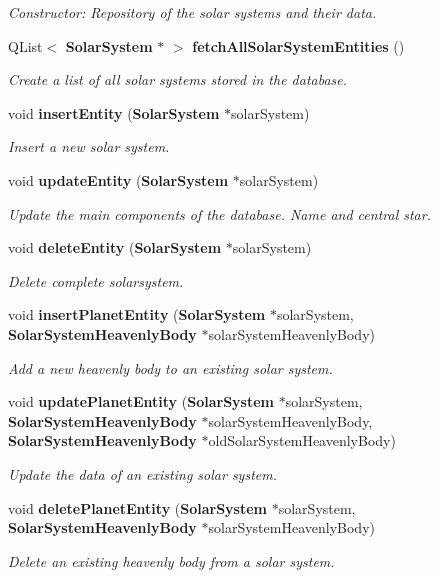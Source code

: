 \begin{DoxyCompactItemize}
\begin{DoxyCompactList}\small\item\em \-Constructor\-: \-Repository of the solar systems and their data. \end{DoxyCompactList}\item 
\-Q\-List$<$ {\bf \-Solar\-System} $\ast$ $>$ {\bf fetch\-All\-Solar\-System\-Entities} ()
\begin{DoxyCompactList}\small\item\em \-Create a list of all solar systems stored in the database. \end{DoxyCompactList}\item 
void {\bf insert\-Entity} ({\bf \-Solar\-System} $\ast$solar\-System)
\begin{DoxyCompactList}\small\item\em \-Insert a new solar system. \end{DoxyCompactList}\item 
void {\bf update\-Entity} ({\bf \-Solar\-System} $\ast$solar\-System)
\begin{DoxyCompactList}\small\item\em \-Update the main components of the database. \-Name and central star. \end{DoxyCompactList}\item 
void {\bf delete\-Entity} ({\bf \-Solar\-System} $\ast$solar\-System)
\begin{DoxyCompactList}\small\item\em \-Delete complete solarsystem. \end{DoxyCompactList}\item 
void {\bf insert\-Planet\-Entity} ({\bf \-Solar\-System} $\ast$solar\-System, {\bf \-Solar\-System\-Heavenly\-Body} $\ast$solar\-System\-Heavenly\-Body)
\begin{DoxyCompactList}\small\item\em \-Add a new heavenly body to an existing solar system. \end{DoxyCompactList}\item 
void {\bf update\-Planet\-Entity} ({\bf \-Solar\-System} $\ast$solar\-System, {\bf \-Solar\-System\-Heavenly\-Body} $\ast$solar\-System\-Heavenly\-Body, {\bf \-Solar\-System\-Heavenly\-Body} $\ast$old\-Solar\-System\-Heavenly\-Body)
\begin{DoxyCompactList}\small\item\em \-Update the data of an existing solar system. \end{DoxyCompactList}\item 
void {\bf delete\-Planet\-Entity} ({\bf \-Solar\-System} $\ast$solar\-System, {\bf \-Solar\-System\-Heavenly\-Body} $\ast$solar\-System\-Heavenly\-Body)
\begin{DoxyCompactList}\small\item\em \-Delete an existing heavenly body from a solar system. \end{DoxyCompactList}\end{DoxyCompactItemize}


